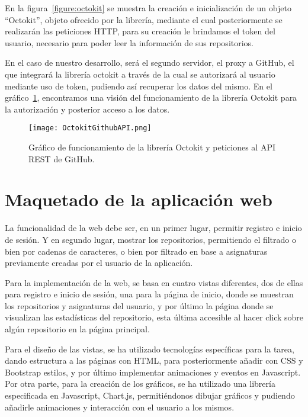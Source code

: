 En la figura~\ref{figure:octokit} se muestra la creación e inicialización
de un objeto ``Octokit'', objeto ofrecido por la librería, mediante el cual
posteriormente se realizarán las peticiones HTTP, para su creación le
brindamos el token del usuario, necesario para poder leer la información de
sus repositorios.

En el caso de nuestro desarrollo, será el segundo servidor, el proxy a
GitHub, el que integrará la librería octokit a través de la cual se
autorizará al usuario mediante uso de token, pudiendo así recuperar los
datos del mismo. En el gráfico~\ref{figure:octokitGitApi}, encontramos una
visión del funcionamiento de la librería Octokit para la autorización y
posterior acceso a los datos.

\begin{figure}[h!]
  \texttt{[image: OctokitGithubAPI.png]}
  \caption{Gráfico de funcionamiento de la librería Octokit y peticiones al
    API REST de GitHub.}
  \label{figure:octokitGitApi}
\end{figure}


\section{Maquetado de la aplicación web}

La funcionalidad de la web debe ser, en un primer lugar, permitir registro
e inicio de sesión. Y en segundo lugar, mostrar los repositorios,
permitiendo el filtrado o bien por cadenas de caracteres, o bien por
filtrado en base a asignaturas previamente creadas por el usuario de la
aplicación.

Para la implementación de la web, se basa en cuatro vistas diferentes, dos
de ellas para registro e inicio de sesión, una para la página de inicio,
donde se muestran los repositorios y asignaturas del usuario, y por último
la página donde se visualizan las estadísticas del repositorio, esta última
accesible al hacer click sobre algún repositorio en la página principal.

Para el diseño de las vistas, se ha utilizado tecnologías específicas para
la tarea, dando estructura a las páginas con HTML, para posteriormente
añadir con CSS\cite{GradienteCSS} y Bootstrap\cite{Bootstrap} estilos, y
por último implementar animaciones y eventos en Javascript. Por otra parte,
para la creación de los gráficos, se ha utilizado una librería especificada
en Javascript, Chart.js\cite{ChartJS,ChartJSIntro}, permitiéndonos dibujar
gráficos y pudiendo añadirle animaciones y interacción con el usuario a los
mismos.

